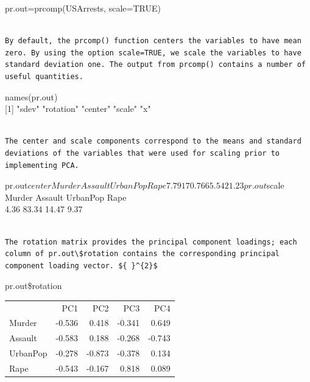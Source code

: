\documentclass[10pt]{article}
\begin{document}
\begin{displayquote}
pr.out=prcomp(USArrests, scale=TRUE)
\end{displayquote}

\begin{verbatim}

By default, the prcomp() function centers the variables to have mean zero. By using the option scale=TRUE, we scale the variables to have standard deviation one. The output from prcomp() contains a number of useful quantities.
\end{verbatim}

\begin{displayquote}
names(pr.out)\\[0pt]
[1] "sdev" "rotation" "center" "scale" "x"
\end{displayquote}

\begin{verbatim}

The center and scale components correspond to the means and standard deviations of the variables that were used for scaling prior to implementing PCA.
\end{verbatim}

\begin{displayquote}
pr.out$center
    Murder Assault UrbanPop Rape
        7.79 170.76 65.54 21.23
pr.out$scale\\
Murder Assault UrbanPop Rape\\
4.36 83.34 14.47 9.37
\end{displayquote}

\begin{verbatim}

The rotation matrix provides the principal component loadings; each column of pr.out\$rotation contains the corresponding principal component loading vector. ${ }^{2}$
\end{verbatim}

\begin{displayquote}
pr.out\$rotation
\end{displayquote}

\begin{center}
\begin{tabular}{lrrrr}
 & PC1 & PC2 & PC3 & PC4 \\
Murder & -0.536 & 0.418 & -0.341 & 0.649 \\
Assault & -0.583 & 0.188 & -0.268 & -0.743 \\
UrbanPop & -0.278 & -0.873 & -0.378 & 0.134 \\
Rape & -0.543 & -0.167 & 0.818 & 0.089 \\
\end{tabular}
\end{center}
\end{document}
